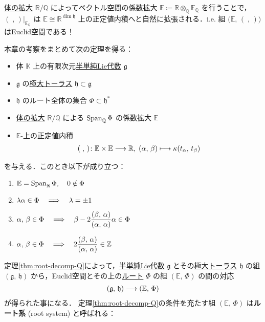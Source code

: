 \documentclass[rep_main]{subfiles}
\begin{document}
\hyperref[def:field-extention]{体の拡大} $\mathbb{R}/\mathbb{Q}$ によってベクトル空間の係数拡大 $\mathbb{E} \coloneqq \mathbb{R} \otimes_{\mathbb{Q}} \mathbb{E}_{\mathbb{Q}}$ を行うことで，$(\;,\, )|_{\mathbb{E}_{\mathbb{Q}}}$ は $\mathbb{E} \cong \mathbb{R}^{\dim \mathfrak{h}}$ 上の正定値内積へと自然に拡張される．i.e. 組 $\bigl(\mathbb{E},\, (\;,\, )\bigr)$ はEuclid空間である！

本章の考察をまとめて次の定理を得る：

\begin{mytheo}[label=thm:root-decomp-Q,breakable]{}
	\begin{itemize}
		\item 体 $\mathbb{K}$ 上の有限次元\hyperref[def:semisimple-LieAlg]{半単純Lie代数} $\mathfrak{g}$
		\item $\mathfrak{g}$ の\hyperref[def:toral-subLieAlg]{極大トーラス} $\mathfrak{h} \subset \mathfrak{g}$
		\item $\mathfrak{h}$ のルート全体の集合 $\Phi \subset \mathfrak{h}^*$ 
		\item \hyperref[def:field-extention]{体の拡大} $\mathbb{R}/\mathbb{Q}$ による $\operatorname{Span}_{\mathbb{Q}}\Phi$ の係数拡大 $\mathbb{E}$
		\item $\mathbb{E}$-上の正定値内積
		\begin{align}
			(\; ,\, ) \colon \mathbb{E} \times \mathbb{E} \longrightarrow \mathbb{R},\; (\alpha,\, \beta) \longmapsto \kappa(t_\alpha,\, t_\beta)
		\end{align}
	\end{itemize}
	を与える．このとき以下が成り立つ：
	\begin{enumerate}
		\item $\mathbb{E} = \operatorname{Span}_{\mathbb{R}}\Phi,\quad 0 \notin \Phi$
		\item $\lambda \alpha \in \Phi \quad \Longrightarrow \quad \lambda = \pm 1$
		\item $\alpha,\, \beta \in \Phi \quad \Longrightarrow \quad \beta - 2\displaystyle\frac{(\beta,\, \alpha)}{(\alpha,\, \alpha)} \alpha \in \Phi$
		\item $\alpha,\, \beta \in \Phi \quad \Longrightarrow \quad 2\displaystyle\frac{(\beta,\, \alpha)}{(\alpha,\, \alpha)} \in \mathbb{Z}$
	\end{enumerate}
\end{mytheo}

定理\ref{thm:root-decomp-Q}によって，\hyperref[def:semisimple-LieAlg]{半単純Lie代数} $\mathfrak{g}$ とその\hyperref[def:toral-subLieAlg]{極大トーラス} $\mathfrak{h}$ の組 $(\mathfrak{g},\, \mathfrak{h})$ 
から，Euclid空間とその上の\hyperref[eq:root-decomp1]{ルート} $\Phi$ の組 $(\mathbb{E},\, \Phi)$ の間の対応
\begin{align}
	(\mathfrak{g},\, \mathfrak{h}) \longrightarrow (\mathbb{E},\, \Phi)
\end{align}
が得られた事になる．
定理\ref{thm:root-decomp-Q}の条件を充たす組 $(\mathbb{E},\, \Phi)$ は\textbf{ルート系} (root system) と呼ばれる：
\end{document}
